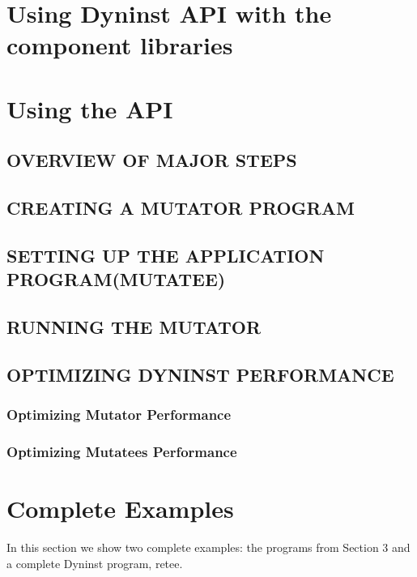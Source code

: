 \documentclass[twopages,a4paper]{article}
\begin{document}
\pagebreak
\tableofcontents

\pagebreak










\section{Using Dyninst API with the component libraries}
\section{Using the API}
\subsection{OVERVIEW OF MAJOR STEPS}
\subsection{CREATING A MUTATOR PROGRAM}
\subsection{SETTING UP THE APPLICATION PROGRAM(MUTATEE)}
\subsection{RUNNING THE MUTATOR}
\subsection{OPTIMIZING DYNINST PERFORMANCE}
\subsubsection{Optimizing Mutator Performance}
\subsubsection{Optimizing Mutatees Performance}

\appendix
\section{Complete Examples}\label{appdx:complete_examples}
In this section we show two complete examples: the programs from Section 3 and a complete Dyninst program, retee.\\
\end{document}
